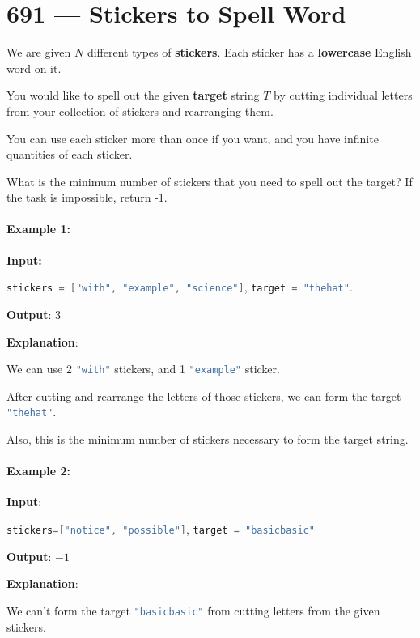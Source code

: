\section{691 --- Stickers to Spell Word}
We are given $N$ different types of \textbf{stickers}. Each sticker has a \textbf{lowercase} English word on it.
\par
You would like to spell out the given \textbf{target} string $T$ by cutting individual letters from your collection of stickers and rearranging them.
\par
You can use each sticker more than once if you want, and you have infinite quantities of each sticker.
\par
What is the minimum number of stickers that you need to spell out the target? If the task is impossible, return -1.
\paragraph{Example 1:}
\begin{flushleft}
\textbf{Input:}

\lstinline[language=C++, basicstyle=\small\ttfamily, keywordstyle=\bfseries\color{green!40!black}]|stickers = ["with", "example", "science"]|, \lstinline[language=C++, basicstyle=\small\ttfamily, keywordstyle=\bfseries\color{green!40!black}]|target = "thehat"|.

\textbf{Output}: 3

\textbf{Explanation}:

We can use 2 \lstinline[language=C++, basicstyle=\small\ttfamily, keywordstyle=\bfseries\color{green!40!black}]|"with"| stickers, and 1 \lstinline[language=C++, basicstyle=\small\ttfamily, keywordstyle=\bfseries\color{green!40!black}]|"example"| sticker.

After cutting and rearrange the letters of those stickers, we can form the target \lstinline[language=C++, basicstyle=\small\ttfamily, keywordstyle=\bfseries\color{green!40!black}]|"thehat"|.

Also, this is the minimum number of stickers necessary to form the target string.
\end{flushleft}

\paragraph{Example 2:}
\begin{flushleft}
\textbf{Input}:

\lstinline[language=C++, basicstyle=\small\ttfamily, keywordstyle=\bfseries\color{green!40!black}]|stickers=["notice", "possible"]|, \lstinline[language=C++, basicstyle=\small\ttfamily, keywordstyle=\bfseries\color{green!40!black}]|target = "basicbasic"|

\textbf{Output}: $-1$

\textbf{Explanation}:

We can't form the target \lstinline[language=C++, basicstyle=\small\ttfamily, keywordstyle=\bfseries\color{green!40!black}]|"basicbasic"| from cutting letters from the given stickers.
\end{flushleft}



